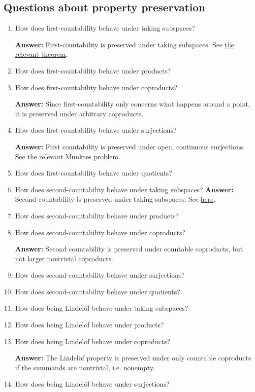 \subsection{Questions about property preservation}
\begin{enumerate}
    \item How does first-countability behave under taking subspaces?

    \textbf{Answer: } First-countability is preserved under taking subspaces. See \hyperlink{FirstSecondCountabilityHereditary}{the relevant theorem}.
    \item How does first-countability behave under products?
    \item How does first-countability behave under coproducts?

    \textbf{Answer: } Since first-countability only concerns what happens around a point, it is preserved under arbitrary coproducts.
    \item How does first-countability behave under surjections?

    \textbf{Answer: } First countability is preserved under open, continuous surjections. See \hyperlink{MunkresP30.12}{the relevant Munkres problem}.
    \item How does first-countability behave under quotients?
    \item How does second-countability behave under taking subspaces?
    \textbf{Answer: } Second-countability is preserved under taking subspaces. See \hyperlink{FirstSecondCountabilityHereditary}{here}.
    \item How does second-countability behave under products?
    \item How does second-countability behave under coproducts?

    \textbf{Answer: } Second countability is preserved under countable coproducts, but not larger nontrivial coproducts.
    \item How does second-countability behave under surjections?
    \item How does second-countability behave under quotients?
    \item How does being Lindel\"of behave under taking subspaces?
    \item How does being Lindel\"of behave under products?
    \item How does being Lindel\"of behave under coproducts?

    \textbf{Answer: } The Lindel\"of property is preserved under only countable coproducts if the summands are nontrivial, i.e. nonempty.
    \item How does being Lindel\"of behave under surjections?


\end{enumerate}
